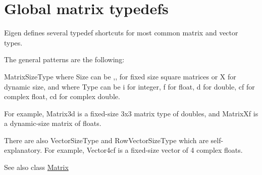 \hypertarget{group__matrixtypedefs}{}\section{Global matrix typedefs}
\label{group__matrixtypedefs}
Eigen defines several typedef shortcuts for most common matrix and vector types.

The general patterns are the following\+:

{\ttfamily Matrix\+Size\+Type} where {\ttfamily Size} can be {},{},{} for fixed size square matrices or {\ttfamily X} for dynamic size, and where {\ttfamily Type} can be {\ttfamily i} for integer, {\ttfamily f} for float, {\ttfamily d} for double, {\ttfamily cf} for complex float, {\ttfamily cd} for complex double.

For example, {\ttfamily Matrix3d} is a fixed-\/size 3x3 matrix type of doubles, and {\ttfamily Matrix\+Xf} is a dynamic-\/size matrix of floats.

There are also {\ttfamily Vector\+Size\+Type} and {\ttfamily Row\+Vector\+Size\+Type} which are self-\/explanatory. For example, {\ttfamily Vector4cf} is a fixed-\/size vector of 4 complex floats.

\begin{DoxySeeAlso}{See also}
class \mbox{\hyperlink{class_eigen_1_1_matrix}{Matrix}} 
\end{DoxySeeAlso}

